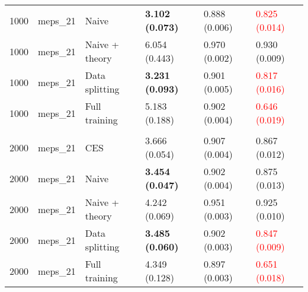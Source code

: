 \begin{tabular}[t]{rlllll}
\hspace{1em}1000 & meps\_21 & Naive & \textbf{3.102 (0.073)} & 0.888 (0.006) & \textcolor{red}{0.825 (0.014)}\\
\hspace{1em}1000 & meps\_21 & Naive + theory & 6.054 (0.443) & 0.970 (0.002) & 0.930 (0.009)\\
\hspace{1em}1000 & meps\_21 & Data splitting & \textbf{3.231 (0.093)} & 0.901 (0.005) & \textcolor{red}{0.817 (0.016)}\\
\hspace{1em}1000 & meps\_21 & Full training & 5.183 (0.188) & 0.902 (0.004) & \textcolor{red}{0.646 (0.019)}\\
\addlinespace[0.3em]
\multicolumn{6}{l}{\textbf{2000}}\\
\hspace{1em}2000 & meps\_21 & CES & 3.666 (0.054) & 0.907 (0.004) & 0.867 (0.012)\\
\hspace{1em}2000 & meps\_21 & Naive & \textbf{3.454 (0.047)} & 0.902 (0.004) & 0.875 (0.013)\\
\hspace{1em}2000 & meps\_21 & Naive + theory & 4.242 (0.069) & 0.951 (0.003) & 0.925 (0.010)\\
\hspace{1em}2000 & meps\_21 & Data splitting & \textbf{3.485 (0.060)} & 0.902 (0.003) & \textcolor{red}{0.847 (0.009)}\\
\hspace{1em}2000 & meps\_21 & Full training & 4.349 (0.128) & 0.897 (0.003) & \textcolor{red}{0.651 (0.018)}\\
\bottomrule
\end{tabular}

